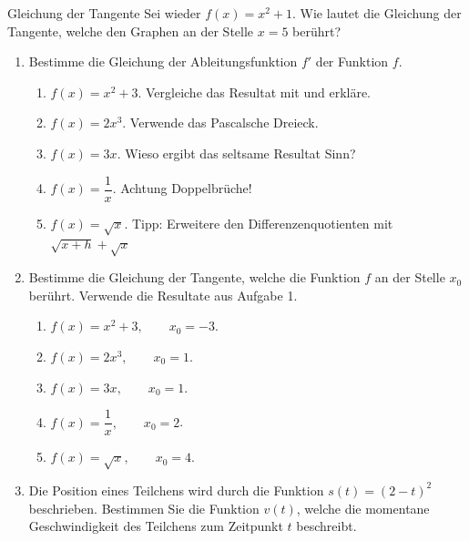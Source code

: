 \begin{bsp}
    {Gleichung der Tangente}{}
    Sei wieder $f(x)=x^2+1$. Wie lautet die Gleichung der Tangente, welche den Graphen an der Stelle $x=5$ berührt?
    
    \vspace*{18cm}

\end{bsp}

\clearpage
\begin{ueb}
    {}{}
    \begin{enumerate}
        \item 
    Bestimme die Gleichung der Ableitungsfunktion \( f' \) der Funktion \( f  \).

            \begin{enumerate}
            \item \( f(x) = x^2 + 3 \). Vergleiche das Resultat mit  und erkläre.
            \item \( f(x) = 2x^3 \). Verwende das Pascalsche Dreieck.
            \item \( f(x) = 3x \). Wieso ergibt das seltsame Resultat Sinn?
            \item \( f(x)= \dfrac{1}{x} \). Achtung Doppelbrüche!
            \item \( f(x) =\sqrt{x} \). Tipp: Erweitere den Differenzenquotienten mit $\sqrt{x+h} + \sqrt{x}$ 
            \end{enumerate}
    \item Bestimme die Gleichung der Tangente, welche die Funktion $f$ an der Stelle $x_0$ berührt. Verwende die Resultate aus Aufgabe 1.
    \begin{enumerate}
        \item \( f(x) = x^2 + 3, \qquad x_0  = -3 \). 
        \item \( f(x) = 2x^3 , \qquad x_0  = 1 \).
        \item \( f(x) = 3x , \qquad x_0  = 1 \). 
        \item \( f(x)= \dfrac{1}{x} , \qquad x_0  = 2 \). 
        \item \( f(x) =\sqrt{x}, \qquad x_0  = 4 \).
        \end{enumerate}
    \item Die Position eines Teilchens wird durch die Funktion $s(t) = (2-t)^2$ beschrieben. Bestimmen Sie die Funktion $v(t)$, welche die momentane Geschwindigkeit des Teilchens zum Zeitpunkt $t$ beschreibt.
\end{enumerate}
\end{ueb}

